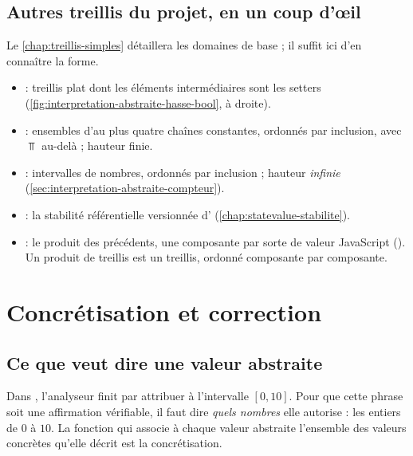 \subsection{Autres treillis du projet, en un coup d'œil}

Le \cref{chap:treillis-simples} détaillera les domaines de base ; il suffit ici
d'en connaître la forme.
\begin{itemize}
  \item {} : treillis plat dont les éléments intermédiaires sont
    les setters 
    (\cref{fig:interpretation-abstraite-hasse-bool}, à droite).
  \item {} : ensembles d'au plus quatre chaînes constantes, ordonnés
    par inclusion, avec $\Top$ au-delà ; hauteur finie.
  \item {} : intervalles de nombres, ordonnés par inclusion ;
    hauteur \emph{infinie} (\cref{sec:interpretation-abstraite-compteur}).
  \item {} : la stabilité référentielle versionnée d'
    (\cref{chap:statevalue-stabilite}).
  \item {} : le produit des précédents, une composante par sorte
    de valeur JavaScript (). Un produit de treillis est un treillis,
    ordonné composante par composante.
\end{itemize}

\section{Concrétisation et correction}
\label{sec:interpretation-abstraite-concretisation}

\subsection{Ce que \og veut dire\fg{} une valeur abstraite}

Dans , l'analyseur finit par attribuer à 
l'intervalle $[0,10]$. Pour que cette phrase soit une affirmation vérifiable,
il faut dire \emph{quels nombres} elle autorise : les entiers de $0$ à $10$. La
fonction qui associe à chaque valeur abstraite l'ensemble des valeurs concrètes
qu'elle décrit est la concrétisation.

